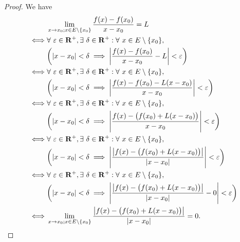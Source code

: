 \begin{proof}
    We have
    \begin{align*}
             & \lim_{x \to x_0 ; x \in E \setminus \{x_0\}} \frac{f(x) - f(x_0)}{x - x_0} = L                                                           \\
        \iff & \forall\ \varepsilon \in \mathbf{R}^+, \exists\ \delta \in \mathbf{R}^+ : \forall\ x \in E \setminus \{x_0\},                            \\
             & \bigg(\abs*{x - x_0} < \delta \implies \abs*{\frac{f(x) - f(x_0)}{x - x_0} - L} < \varepsilon\bigg)                                      \\
        \iff & \forall\ \varepsilon \in \mathbf{R}^+, \exists\ \delta \in \mathbf{R}^+ : \forall\ x \in E \setminus \{x_0\},                            \\
             & \bigg(\abs*{x - x_0} < \delta \implies \abs*{\frac{f(x) - f(x_0) - L(x - x_0)}{x - x_0}} < \varepsilon\bigg)                             \\
        \iff & \forall\ \varepsilon \in \mathbf{R}^+, \exists\ \delta \in \mathbf{R}^+ : \forall\ x \in E \setminus \{x_0\},                            \\
             & \bigg(\abs*{x - x_0} < \delta \implies \abs*{\frac{f(x) - \big(f(x_0) + L(x - x_0)\big)}{x - x_0}} < \varepsilon\bigg)                   \\
        \iff & \forall\ \varepsilon \in \mathbf{R}^+, \exists\ \delta \in \mathbf{R}^+ : \forall\ x \in E \setminus \{x_0\},                            \\
             & \bigg(\abs*{x - x_0} < \delta \implies \abs*{\frac{\abs*{f(x) - \big(f(x_0) + L(x - x_0)\big)}}{\abs*{x - x_0}}} < \varepsilon\bigg)     \\
        \iff & \forall\ \varepsilon \in \mathbf{R}^+, \exists\ \delta \in \mathbf{R}^+ : \forall\ x \in E \setminus \{x_0\},                            \\
             & \bigg(\abs*{x - x_0} < \delta \implies \abs*{\frac{\abs*{f(x) - \big(f(x_0) + L(x - x_0)\big)}}{\abs*{x - x_0}} - 0} < \varepsilon\bigg) \\
        \iff & \lim_{x \to x_0 ; x \in E \setminus \{x_0\}} \frac{\abs*{f(x) - \big(f(x_0) + L(x - x_0)\big)}}{\abs*{x - x_0}} = 0.
    \end{align*}
\end{proof}

